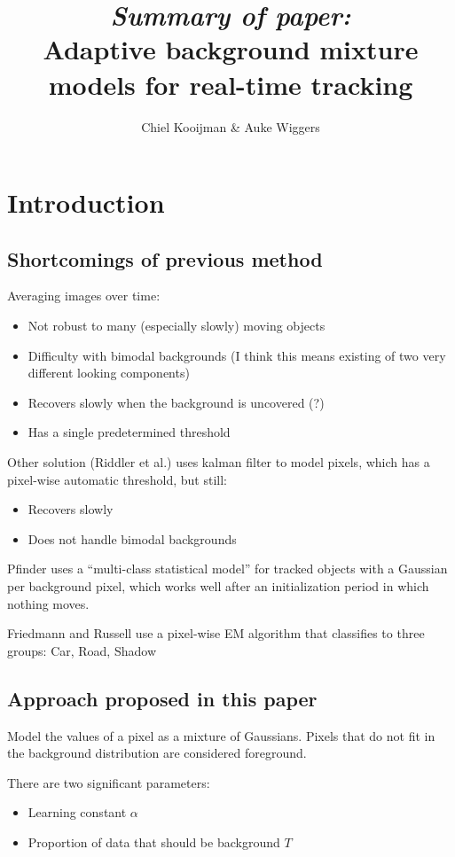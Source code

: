 \documentclass{article}
\title{\emph{Summary of paper:}\\Adaptive background mixture models for real-time
tracking}
\author{Chiel Kooijman \& Auke Wiggers}
\begin{document}
\maketitle

\section{Introduction}
\subsection{Shortcomings of previous method}
	Averaging images over time:
	\begin{itemize}
		\item Not robust to many (especially slowly) moving objects
		\item Difficulty with bimodal backgrounds (I think this means existing
		of two very different looking components)
		\item Recovers slowly when the background is uncovered (?)
		\item Has a single predetermined threshold
	\end{itemize}
	Other solution (Riddler et al.) uses kalman filter to model pixels, which
	has a pixel-wise automatic threshold, but still:
	\begin{itemize}
	\item Recovers slowly
	\item Does not handle bimodal backgrounds
	\end{itemize}

	Pfinder uses a ``multi-class statistical model'' for tracked objects with a
	Gaussian per background pixel, which works well after an initialization
	period in which nothing moves.

	Friedmann and Russell use a pixel-wise EM algorithm that classifies to
	three groups: Car, Road, Shadow


\subsection{Approach proposed in this paper}
	Model the values of a pixel as a mixture of Gaussians. Pixels that do not
	fit in the background distribution are considered foreground.

	There are two significant parameters:
	\begin{itemize}
	\item Learning constant $\alpha$
	\item Proportion of data that should be background $T$
	\end{itemize}
\end{document}
